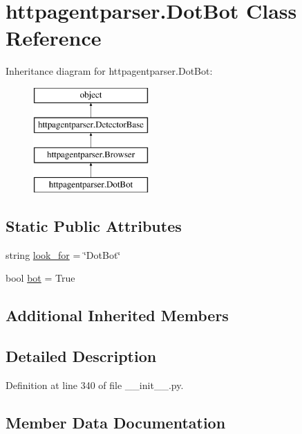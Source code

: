 \hypertarget{classhttpagentparser_1_1_dot_bot}{}\section{httpagentparser.\+Dot\+Bot Class Reference}
\label{classhttpagentparser_1_1_dot_bot}
Inheritance diagram for httpagentparser.\+Dot\+Bot\+:\begin{figure}[H]
\begin{center}
\leavevmode
\includegraphics[height=4.000000cm]{classhttpagentparser_1_1_dot_bot}
\end{center}
\end{figure}
\subsection*{Static Public Attributes}
\begin{DoxyCompactItemize}
\item 
string \hyperlink{classhttpagentparser_1_1_dot_bot_a9128a7e4078a082a15797ee712a8cceb}{look\+\_\+for} = \char`\"{}Dot\+Bot\char`\"{}
\item 
bool \hyperlink{classhttpagentparser_1_1_dot_bot_a907f4c72f3ff4f51c18f2fa93105c1b4}{bot} = True
\end{DoxyCompactItemize}
\subsection*{Additional Inherited Members}


\subsection{Detailed Description}


Definition at line 340 of file \+\_\+\+\_\+init\+\_\+\+\_\+.\+py.



\subsection{Member Data Documentation}
\hypertarget{classhttpagentparser_1_1_dot_bot_a907f4c72f3ff4f51c18f2fa93105c1b4}{}\label{classhttpagentparser_1_1_dot_bot_a907f4c72f3ff4f51c18f2fa93105c1b4} 
